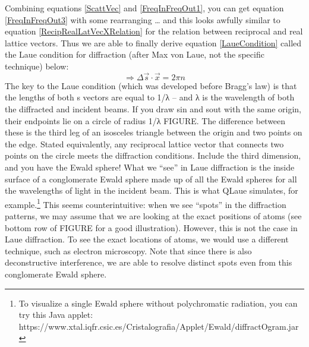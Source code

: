Combining equations \ref{ScattVec} and \ref{FreqInFreqOut1}, you can get equation \ref{FreqInFreqOut3} with some rearranging … and this looks awfully similar to equation \ref{RecipRealLatVecXRelation} for the relation between reciprocal and real lattice vectors. Thus we are able to finally derive equation \ref{LaueCondition} called the Laue condition for diffraction (after Max von Laue, not the specific technique) below: 
\begin{equation}
    \Rightarrow\Delta\vec{s}\cdot\vec{x}=2\pi n
    \label{LaueCondition}
\end{equation}
The key to the Laue condition (which was developed before Bragg’s law)  is that the lengths of both s vectors are equal to 1/λ – and λ is the wavelength of both the diffracted and incident beams. If you draw sin and sout with the same origin, their endpoints lie on a circle of radius 1/λ FIGURE. The difference between these is the third leg of an isosceles triangle between the origin and two points on the edge. Stated equivalently, any reciprocal lattice vector that connects two points on the circle meets the diffraction conditions. 
Include the third dimension, and you have the Ewald sphere!
What we “see” in Laue diffraction is the inside surface of a conglomerate Ewald sphere made up of all the Ewald spheres for all the wavelengths of light in the incident beam. This is what QLaue simulates, for example.\footnote{To visualize a single Ewald sphere without polychromatic radiation, you can try this Java applet: https://www.xtal.iqfr.csic.es/Cristalografia/Applet/Ewald/diffractOgram.jar}
This seems counterintuitive: when we see “spots” in the diffraction patterns, we may assume that we are looking at the exact positions of atoms (see bottom row of FIGURE for a good illustration). However, this is not the case in Laue diffraction. To see the exact locations of atoms, we would use a different technique, such as electron microscopy.
Note that since there is also deconstructive interference, we are able to resolve distinct spots even from this conglomerate Ewald sphere. 

